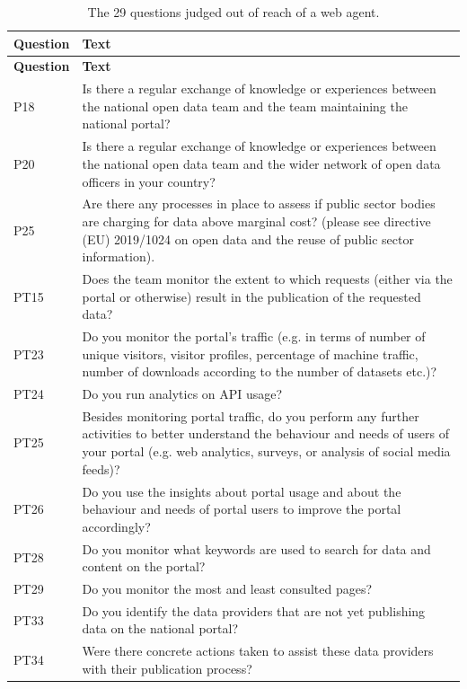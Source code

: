 {\footnotesize
\begin{longtable}[]{@{}
  L{0.1386}
  L{0.8614}@{}}
\caption{The 29 questions judged out of reach of a web agent.}\label{tab:out-of-reach}\\
\toprule\noalign{}
\textbf{Question} & \textbf{Text} \\
\midrule\noalign{}
\endfirsthead
\toprule\noalign{}
\textbf{Question} & \textbf{Text} \\
\midrule\noalign{}
\endhead
\bottomrule\noalign{}
\endlastfoot
P18 & Is there a regular exchange of knowledge or experiences between the national open data team and the team maintaining the national portal? \\
P20 & Is there a regular exchange of knowledge or experiences between the national open data team and the wider network of open data officers in your country? \\
P25 & Are there any processes in place to assess if public sector bodies are charging for data above marginal cost? (please see directive (EU) 2019/1024 on open data and the reuse of public sector information). \\
PT15 & Does the team monitor the extent to which requests (either via the portal or otherwise) result in the publication of the requested data? \\
PT23 & Do you monitor the portal's traffic (e.g. in terms of number of unique visitors, visitor profiles, percentage of machine traffic, number of downloads according to the number of datasets etc.)? \\
PT24 & Do you run analytics on API usage? \\
PT25 & Besides monitoring portal traffic, do you perform any further activities to better understand the behaviour and needs of users of your portal (e.g. web analytics, surveys, or analysis of social media feeds)? \\
PT26 & Do you use the insights about portal usage and about the behaviour and needs of portal users to improve the portal accordingly? \\
PT28 & Do you monitor what keywords are used to search for data and content on the portal? \\
PT29 & Do you monitor the most and least consulted pages? \\
PT33 & Do you identify the data providers that are not yet publishing data on the national portal? \\
PT34 & Were there concrete actions taken to assist these data providers with their publication process? \\

\end{longtable}}

